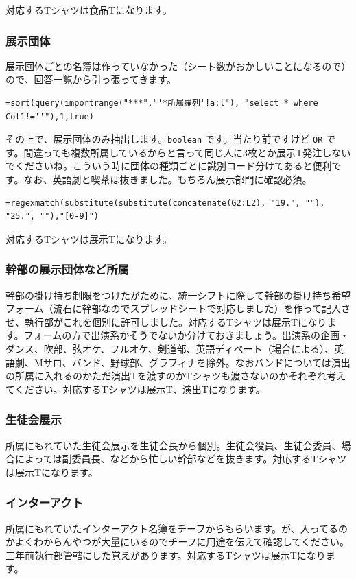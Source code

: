 \documentclass[dvipdfmx,jb5]{jreport}
\begin{document}
対応するTシャツは食品Tになります。

\subsubsection{展示団体}
展示団体ごとの名簿は作っていなかった（シート数がおかしいことになるので）ので、回答一覧から引っ張ってきます。

\begin{lstlisting}
=sort(query(importrange("***","'*所属羅列'!a:l"), "select * where Col1!=''"),1,true)
\end{lstlisting}

その上で、展示団体のみ抽出します。\texttt{boolean} です。当たり前ですけど \texttt{OR} です。間違っても複数所属しているからと言って同じ人に3枚とか展示T発注しないでくださいね。こういう時に団体の種類ごとに識別コード分けてあると便利です。なお、英語劇と喫茶は抜きました。もちろん展示部門に確認必須。

\begin{lstlisting}
=regexmatch(substitute(substitute(concatenate(G2:L2), "19.", ""), "25.", ""),"[0-9]")
\end{lstlisting}

対応するTシャツは展示Tになります。

\subsubsection{幹部の展示団体など所属}
幹部の掛け持ち制限をつけたがために、統一シフトに際して幹部の掛け持ち希望フォーム（流石に幹部なのでスプレッドシートで対応しました）を作って記入させ、執行部がこれを個別に許可しました。対応するTシャツは展示Tになります。フォームの方で出演系かそうでないか分けておきましょう。出演系の企画・ダンス、吹部、弦オケ、フルオケ、剣道部、英語ディベート（場合による）、英語劇、Mサロ、バンド、野球部、グラフィナを除外。なおバンドについては演出の所属に入れるのかただ演出Tを渡すのかTシャツも渡さないのかそれぞれ考えてください。対応するTシャツは展示T、演出Tになります。

\subsubsection{生徒会展示}
所属にもれていた生徒会展示を生徒会長から個別。生徒会役員、生徒会委員、場合によっては副委員長、などから忙しい幹部などを抜きます。対応するTシャツは展示Tになります。

\subsubsection{インターアクト}
所属にもれていたインターアクト名簿をチーフからもらいます。が、入ってるのかよくわからんやつが大量にいるのでチーフに用途を伝えて確認してください。三年前執行部管轄にした覚えがあります。対応するTシャツは展示Tになります。
\end{document}

